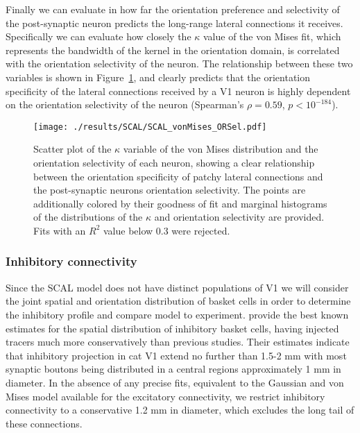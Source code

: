 Finally we can evaluate in how far the orientation preference and
selectivity of the post-synaptic neuron predicts the long-range
lateral connections it receives. Specifically we can evaluate how
closely the $\kappa$ value of the von Mises fit, which represents the
bandwidth of the kernel in the orientation domain, is correlated with
the orientation selectivity of the neuron. The relationship between
these two variables is shown in Figure~\ref{LatORKappa}, and clearly
predicts that the orientation specificity of the lateral connections
received by a V1 neuron is highly dependent on the orientation
selectivity of the neuron (Spearman's $\rho=0.59$, $p<10^{-184}$).


\begin{figure}
	\centering
        \texttt{[image: ./results/SCAL/SCAL\_vonMises\_ORSel.pdf]}
	\caption[Relationship between the width of von Mises distribution
      in the lateral connectivity model and the orientation
      selectivity of the neuron.]{Scatter plot of the $\kappa$
      variable of the von Mises distribution and the orientation
      selectivity of each neuron, showing a clear relationship between
      the orientation specificity of patchy lateral connections and
      the post-synaptic neurons orientation selectivity. The points
      are additionally colored by their goodness of fit and marginal
      histograms of the distributions of the $\kappa$ and orientation
      selectivity are provided. Fits with an $R^2$ value below 0.3
      were rejected.}
	\label{LatORKappa}
\end{figure}

\subsubsection*{Inhibitory connectivity}

Since the SCAL model does not have distinct populations of V1 we will
consider the joint spatial and orientation distribution of basket
cells in order to determine the inhibitory profile and compare model
to experiment. \cite{Kisvarday1997a} provide the best known estimates
for the spatial distribution of inhibitory basket cells, having
injected tracers much more conservatively than previous studies. Their
estimates indicate that inhibitory projection in cat V1 extend no
further than 1.5-2 mm with most synaptic boutons being distributed in
a central regions approximately 1 mm in diameter. In the absence of
any precise fits, equivalent to the Gaussian and von Mises model
available for the excitatory connectivity, we restrict inhibitory
connectivity to a conservative 1.2 mm in diameter, which excludes the
long tail of these connections.


